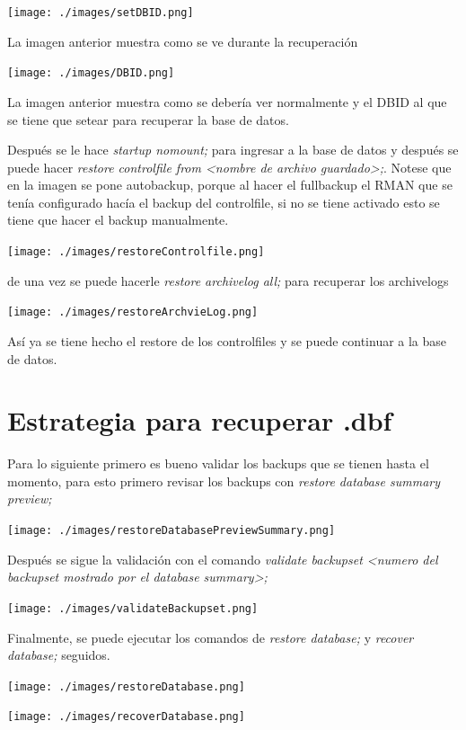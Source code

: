 \documentclass[11pt, article, natbib]{IEEEtran}
\begin{document}
\texttt{[image: ./images/setDBID.png]}

La imagen anterior muestra como se ve durante la recuperación

\texttt{[image: ./images/DBID.png]}

La imagen anterior muestra como se debería ver normalmente y el DBID al que se tiene que setear para recuperar la base de datos.

Después se le hace \textit{startup nomount;} para ingresar a la base de datos y después se puede hacer \textit{restore controlfile from <nombre de archivo guardado>;}. Notese que en la imagen se pone autobackup, porque al hacer el fullbackup el RMAN que se tenía configurado hacía el backup del controlfile, si no se tiene activado esto se tiene que hacer el backup manualmente.

\texttt{[image: ./images/restoreControlfile.png]}

de una vez se puede hacerle \textit{restore archivelog all;} para recuperar los archivelogs

\texttt{[image: ./images/restoreArchvieLog.png]}

Así ya se tiene hecho el restore de los controlfiles y se puede continuar a la base de datos.

\section{Estrategia para recuperar .dbf}

Para lo siguiente primero es bueno validar los backups que se tienen hasta el momento, para esto primero revisar los backups con \textit{restore database summary preview;}

\texttt{[image: ./images/restoreDatabasePreviewSummary.png]}

Después se sigue la validación con el comando \textit{validate backupset <numero del backupset mostrado por el database summary>;}

\texttt{[image: ./images/validateBackupset.png]}

Finalmente, se puede ejecutar los comandos de \textit{restore database;} y \textit{recover database;} seguidos.

\texttt{[image: ./images/restoreDatabase.png]}

\texttt{[image: ./images/recoverDatabase.png]}

\newpage
\onecolumn


\nocite{errorLoginRMAN}
\nocite{vinchin}
\nocite{wordpress}
\nocite{oracleSupport}
\nocite{oracleDocs}
%  
% 
\printbibliography
\end{document}
